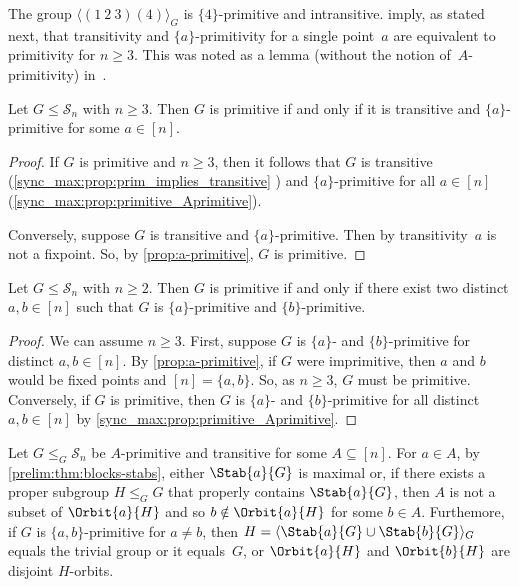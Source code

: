 The group $\langle (1 ~ 2 ~ 3)(4) \rangle_G$ is $\{4\}$-primitive and intransitive.
imply, as stated next, that transitivity and $\{a\}$-primitivity
for a single point~$a$ are equivalent to primitivity for $n \ge 3$. This was noted as a lemma (without the notion of~$A$-primitivity) in~\cite[p.~735]{IsaacsZ95}.

\begin{corollary}\label{prim-a-primitive-trans}
	Let $G \le \mathcal S_n$ with $n \ge 3$.
	Then $G$ is primitive
	if and only if it is transitive and $\{a\}$-primitive for some $a \in [n]$.
\end{corollary}
\begin{proof} 
	If $G$ is primitive and $n \ge 3$,  
	then it follows that $G$ is transitive (\cref{sync_max:prop:prim_implies_transitive} )
	and $\{a\}$-primitive for all $a \in [n]$ (\cref{sync_max:prop:primitive_Aprimitive}).
	
	Conversely, suppose $G$ is transitive and $\{a\}$-primitive.
	Then by transitivity~$a$ is not a fixpoint.	So, by \cref{prop:a-primitive}, $G$ is primitive.	
\end{proof}

\begin{corollary}
	\label{syncaut:cor:Aprim:prim}
	Let $G \le \mathcal S_n$ with $n \ge 2$.
	Then $G$ is primitive if and only if there exist two  distinct $a,b \in [n]$
	such that $G$
	is $\{a\}$-primitive and $\{b\}$-primitive.	
\end{corollary}
\begin{proof}
	We can assume $n \ge 3$.
	First, suppose $G$ is $\{a\}$- and $\{b\}$-primitive
	for distinct $a,b \in [n]$.
	By \cref{prop:a-primitive},
	if $G$ were imprimitive, then $a$
	and $b$ would be fixed points and $[n] = \{a,b\}$.
	So, as $n \ge 3$, $G$ must 
	be primitive.
	Conversely, if $G$ is primitive, then $G$ is $\{a\}$- and $\{b\}$-primitive
	for all distinct $a,b \in [n]$ by \cref{sync_max:prop:primitive_Aprimitive}.
\end{proof}

\begin{remark}
	Let $G \le_G \mathcal S_n$ be $A$-primitive and transitive for some $A \subseteq [n]$.
	For $a \in A$, by \cref{prelim:thm:blocks-stabs}, either $\Stab{a}{G}$ is maximal
	or, if there exists a proper subgroup $H \le_G G$ that properly contains $\Stab{a}{G}$,
	then $A$ is not a subset of $\Orbit{a}{H}$ and so $b \notin \Orbit{a}{H}$ for some $b \in A$.
	Furthemore, if $G$ is $\{a,b\}$-primitive for $a \ne b$, then
	$H = \langle \Stab{a}{G} \cup \Stab{b}{G} \rangle_G$
	equals the trivial group or it equals~$G$, or $\Orbit{a}{H}$ and $\Orbit{b}{H}$
	are disjoint $H$-orbits.
\end{remark}


